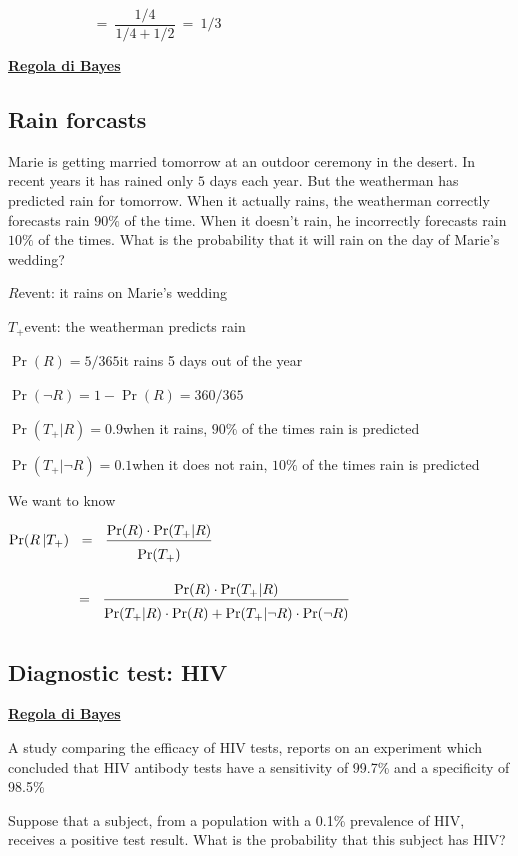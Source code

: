\documentclass[11pt,openany]{book}
\begin{document}
$\phantom{\Pr(C|S_{na})}\ =\ \dfrac{1/4}{1/4+1/2}\ =\ 1/3$


\clearpage\hfill
\textbf{{\color{brown}\hyperref[RegolaBayes]{Regola di Bayes} \faShare}}
\subsection{Rain forcasts}
\label{rain_desert}

Marie is getting married tomorrow at an outdoor ceremony in the desert. In recent years it has rained only $5$ days each year. But the weatherman has predicted rain for tomorrow. When it actually rains, the weatherman correctly forecasts rain $90\%$ of the time. When it doesn’t rain, he incorrectly forecasts rain $10\%$ of the times. What is the probability that it will rain on the day of Marie’s wedding?


$R$\hfill event: it rains on Marie’s wedding

$T_+$\hfill event: the weatherman predicts rain

$\Pr(R) = 5/365$\hfill it rains 5 days out of the year

$\Pr(\neg R) = 1-\Pr(R)= 360/365$

$\Pr(T_+|R) = 0.9$\hfill when it rains, $90\%$ of the times rain is predicted

$\Pr(T_+|\neg R) = 0.1$\hfill when it does not rain, $10\%$ of the times rain is predicted

\bigskip
We want to know

$\displaystyle \Pr(R\,| T_+)\medrel{=}\frac{\Pr(R)\cdot \Pr(T_+|R)}{\Pr(T_+)\vphantom{\Big[}}$

$\displaystyle\hphantom{\Pr(R | T_+)}\medrel{=}\frac{\Pr(R)\cdot \Pr(T_+|R)}{\Pr(T_+|R)\cdot \Pr(R)+ \Pr(T_+|\neg R)\cdot \Pr(\neg R)\vphantom{\Big[}}$

\clearpage\subsection{Diagnostic test: HIV}
\hfill\textbf{{\color{brown}\hyperref[RegolaBayes]{Regola di Bayes} \faShare}}
\label{HIV_test}

A study comparing the efficacy of HIV tests, reports on an
experiment which concluded that HIV antibody tests have a
{\color{violet}sensitivity of 99.7\%} and a {\color{violet}specificity of 98.5\%}

Suppose that a subject, from a population with a {\color{violet} 0.1\% prevalence}
of HIV, receives a positive test result. What is the probability
that this subject has HIV?
\end{document}
